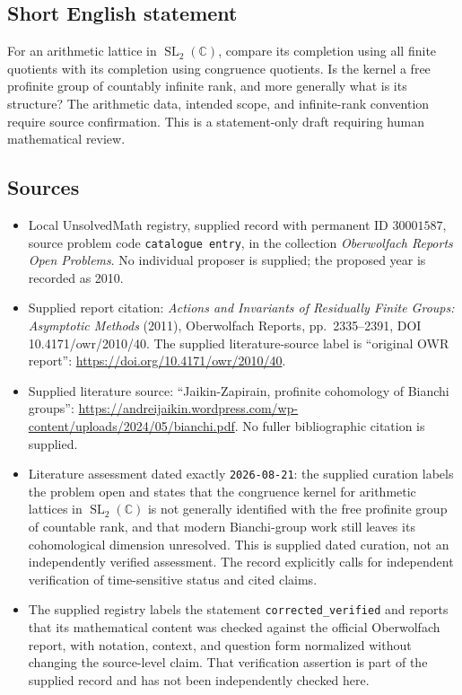 \documentclass[11pt]{article}
\newcommand{\C}{\mathbb{C}}
\begin{document}
\subsection{Short English statement}
For an arithmetic lattice in \(\operatorname{SL}_2(\C)\), compare its completion using all finite quotients with its completion using congruence quotients. Is the kernel a free profinite group of countably infinite rank, and more generally what is its structure? The arithmetic data, intended scope, and infinite-rank convention require source confirmation. This is a statement-only draft requiring human mathematical review.
\subsection{Sources}
\begin{itemize}
\item Local UnsolvedMath registry, supplied record with permanent ID \(30001587\), source problem code \texttt{catalogue entry}, in the collection \emph{Oberwolfach Reports Open Problems}. No individual proposer is supplied; the proposed year is recorded as 2010.
\item Supplied report citation: \emph{Actions and Invariants of Residually Finite Groups: Asymptotic Methods} (2011), Oberwolfach Reports, pp.\ 2335--2391, DOI 10.4171/owr/2010/40. The supplied literature-source label is ``original OWR report'': \url{https://doi.org/10.4171/owr/2010/40}.
\item Supplied literature source: ``Jaikin-Zapirain, profinite cohomology of Bianchi groups'': \url{https://andreijaikin.wordpress.com/wp-content/uploads/2024/05/bianchi.pdf}. No fuller bibliographic citation is supplied.
\item Literature assessment dated exactly \texttt{2026-08-21}: the supplied curation labels the problem open and states that the congruence kernel for arithmetic lattices in \(\operatorname{SL}_2(\C)\) is not generally identified with the free profinite group of countable rank, and that modern Bianchi-group work still leaves its cohomological dimension unresolved. This is supplied dated curation, not an independently verified assessment. The record explicitly calls for independent verification of time-sensitive status and cited claims.
\item The supplied registry labels the statement \texttt{corrected\_verified} and reports that its mathematical content was checked against the official Oberwolfach report, with notation, context, and question form normalized without changing the source-level claim. That verification assertion is part of the supplied record and has not been independently checked here.
\end{itemize}
\end{document}
